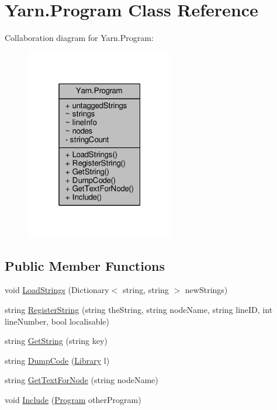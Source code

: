 \hypertarget{a00124}{\section{Yarn.\-Program Class Reference}
\label{a00124}
}


Collaboration diagram for Yarn.\-Program\-:
\nopagebreak
\begin{figure}[H]
\begin{center}
\leavevmode
\includegraphics[width=184pt]{d2/da3/a00520}
\end{center}
\end{figure}
\subsection*{Public Member Functions}
\begin{DoxyCompactItemize}
\item 
void \hyperlink{a00124_a977d1ed02e3f6f39d30dfea1663e7927}{Load\-Strings} (Dictionary$<$ string, string $>$ new\-Strings)
\item 
string \hyperlink{a00124_a9baf491479375aa8c3aa2b0c31cf0932}{Register\-String} (string the\-String, string node\-Name, string line\-I\-D, int line\-Number, bool localisable)
\item 
string \hyperlink{a00124_a14737b93594c4aab25c59cb0a3c918f7}{Get\-String} (string key)
\item 
string \hyperlink{a00124_a2f5bb468ce53eb7bbe647e3c11ddbb61}{Dump\-Code} (\hyperlink{a00101}{Library} l)
\item 
string \hyperlink{a00124_aad8029f37832ff1985fad6a31e51afd8}{Get\-Text\-For\-Node} (string node\-Name)
\item 
void \hyperlink{a00124_afd3385ca1f7589b3b9dae3646e4fee84}{Include} (\hyperlink{a00124}{Program} other\-Program)
\end{DoxyCompactItemize}
